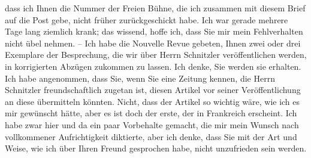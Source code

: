 \begin{otherlanguage}{french}
{{{                        dass ich Ihnen die Nummer der Freien Bühne, die
                        ich zusammen mit diesem Brief auf die Post gebe, nicht früher
                        zurückgeschickt habe. Ich war gerade mehrere Tage lang ziemlich krank; das
                        wissend, hoffe ich, dass Sie mir mein Fehlverhalten nicht übel nehmen. – Ich
                        habe die Nouvelle Revue gebeten, Ihnen
                        zwei oder drei Exemplare der Besprechung, die wir über Herrn Schnitzler veröffentlichen werden, in korrigierten
                        Abzügen zukommen zu lassen. Ich denke, Sie werden sie erhalten. Ich habe
                        angenommen, dass Sie, wenn Sie eine Zeitung kennen, die Herrn Schnitzler freundschaftlich zugetan ist, diesen Artikel vor seiner
                        Veröffentlichung an diese übermitteln könnten. Nicht, dass der Artikel so wichtig
                        wäre, wie ich es mir gewünscht hätte, aber es ist doch der erste, der in Frankreich erscheint. Ich habe zwar hier
                        und da ein paar Vorbehalte gemacht, die mir mein Wunsch nach vollkommener
                        Aufrichtigkeit diktierte, aber ich denke, dass Sie mit der Art und Weise,
                        wie ich über Ihren Freund gesprochen habe, nicht unzufrieden sein werden.}}}\label{K_L02777-5}\end{otherlanguage}\pend
           
